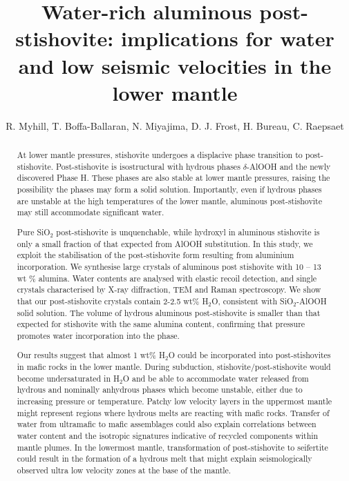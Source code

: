\documentclass[review]{elsarticle}
\begin{document}
\begin{frontmatter}

\title{Water-rich aluminous post-stishovite: implications for water and low seismic velocities in the lower mantle}

\author{R. Myhill, T. Boffa-Ballaran, N. Miyajima, D. J. Frost, H. Bureau, C. Raepsaet}
\address{Bayerisches Geoinstitut, Universit\"{a}t Bayreuth, Universit\"{a}tsstrasse 30, 95447 Bayreuth, Germany}

\begin{abstract}
  At lower mantle pressures, stishovite undergoes a displacive phase transition to post-stishovite. Post-stishovite is isostructural with hydrous phases $\delta$-AlOOH and the newly discovered Phase H. These phases are also stable at lower mantle pressures, raising the possibility the phases may form a solid solution. Importantly, even if hydrous phases are unstable at the high temperatures of the lower mantle, aluminous post-stishovite may still accommodate significant water. 

  Pure SiO$_2$ post-stishovite is unquenchable, while hydroxyl in aluminous stishovite is only a small fraction of that expected from AlOOH substitution. In this study, we exploit the stabilisation of the post-stishovite form resulting from aluminium incorporation. We synthesise large crystals of aluminous post stishovite with 10 -- 13 wt \% alumina. Water contents are analysed with elastic recoil detection, and single crystals characterised by X-ray diffraction, TEM and Raman spectroscopy. We show that our post-stishovite crystals contain 2-2.5 wt\% H$_2$O, consistent with SiO$_2$-AlOOH solid solution. The volume of hydrous aluminous post-stishovite is smaller than that expected for stishovite with the same alumina content, confirming that pressure promotes water incorporation into the phase.

  Our results suggest that almost 1 wt\% H$_2$O could be incorporated into post-stishovites in mafic rocks in the lower mantle. During subduction, stishovite/post-stishovite would become undersaturated in H$_2$O and be able to accommodate water released from hydrous and nominally anhydrous phases which become unstable, either due to increasing pressure or temperature. Patchy low velocity layers in the uppermost mantle might represent regions where hydrous melts are reacting with mafic rocks. Transfer of water from ultramafic to mafic assemblages could also explain correlations between water content and the isotropic signatures indicative of recycled components within mantle plumes. In the lowermost mantle, transformation of post-stishovite to seifertite could result in the formation of a hydrous melt that might explain seismologically observed ultra low velocity zones at the base of the mantle.


\end{abstract}
\end{frontmatter}
\end{document}

